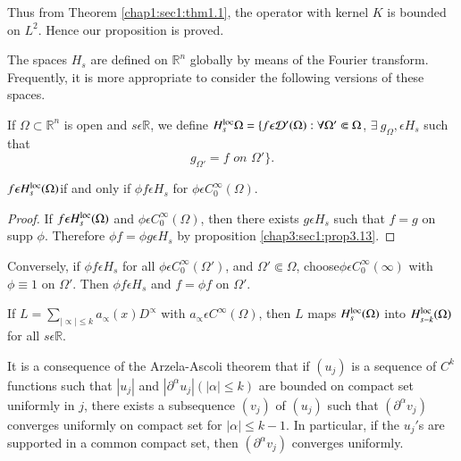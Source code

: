 Thus from  Theorem \ref{chap1:sec1:thm1.1}, the operator with kernel
$K$ is bounded on $L^2$. Hence our proposition is proved.  

The spaces $H_s$ are defined on $\mathbb{R}^n$ globally by means of
the Fourier transform. Frequently, it is more appropriate to consider
the following versions of these spaces.  

\setcounter{defi}{13}
\begin{defi}\label{chap3:sec1:dif3.14}	%
If $\Omega \subset \mathbb{R}^n$ is open and $ s \epsilon
  \mathbb{R}$, we define $H^{\loc}_{s}\Omega = \{ f \epsilon
  \mathcal{D'}\break (\Omega) : \forall {\Omega}' \Subset \Omega$,  
  $ \exists ~g_{\Omega}, \epsilon H_s$  such that 
 $$
 g_{\Omega'} = f \textit{ on } \Omega ' \}. 
 $$
\end{defi}

\setcounter{prop}{14}
\begin{prop} \label{chap3:sec1:prop3.15}%
  $f \epsilon H^{\operatorname{loc}}_s (\Omega)$\pageoriginale if and only if $ \phi f
  \epsilon H_s$  for $\phi \epsilon C^{\infty}_{0} (\Omega)$.
\end{prop}

\begin{proof}
If $f \epsilon H^{\operatorname{loc}}_s(\Omega)$ and $\phi \epsilon C^\infty
_0(\Omega)$, then there exists $g \epsilon H_s$ such that $f=g$ on
supp $\phi$. Therefore $\phi f = \phi g \epsilon H_s$ by
proposition \ref{chap3:sec1:prop3.13}. 
\end{proof}

Conversely, if $\phi f \epsilon H_s$ for all $\phi \epsilon
C^\infty_0 (\Omega')$, and $\Omega' \Subset \Omega$, choose\break $\phi
\epsilon C^\infty _0(\infty)$ with $\phi \equiv 1$ on
$\Omega'$. Then $\phi f \epsilon H_s$ and $f = \phi f$ on
$\Omega'$.  

\setcounter{coro}{15}
\begin{coro} \label{chap3:sec1:coro3.16}%
  If $L = \sum\limits_{|\propto|\leq k} a_\propto (x)D^\propto$
  with $a_\propto \epsilon C^\infty (\Omega)$, then $L$ maps
  $H^{\operatorname{loc}}_s(\Omega) $ into $H^{\operatorname{loc}}_{s-k}(\Omega) $ for all $s
  \epsilon \mathbb{R}$.  
\end{coro}
	
It is a consequence of the Arzela-Ascoli theorem that if $(u_j)$ is a
sequence of $C^k$ functions such that $|u_j|$ and
$|\partial^{\alpha}u_j| (|\alpha |\leq k)$ are bounded on compact
set uniformly in $j$, there exists a subsequence $(v_j)$ of $(u_j)$
such that $(\partial^{\alpha} {v_j})$ converges uniformly on compact
set for $|\alpha |\leq k -1$. In particular, if the $u_j'$s are
supported in a common compact set, then $(\partial^{\alpha} v_j)$
converges uniformly.   

